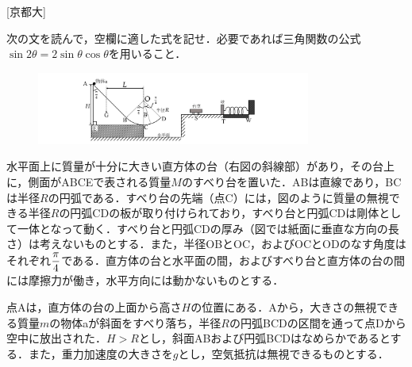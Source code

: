 

\noindent{} [京都大]

次の文を読んで，空欄に適した式を記せ．必要であれば三角関数の公式$\sin 2\theta = 2 \sin \theta \cos \theta$を用いること．

\begin{figure}
  \centering
  \includegraphics[width=9cm]{fig/fig_1_3.pdf}
\end{figure}
水平面上に質量が十分に大きい直方体の台（右図の斜線部）があり，その台上に，側面がABCEで表される質量$M$のすべり台を置いた．ABは直線であり，BCは半径$R$の円弧である．すべり台の先端（点C）には，図のように質量の無視できる半径$R$の円弧CDの板が取り付けられており，すべり台と円弧CDは剛体として一体となって動く．すべり台と円弧CDの厚み（図では紙面に垂直な方向の長さ）は考えないものとする．また，半径OBとOC，およびOCとODのなす角度はそれぞれ$\displaystyle\frac{\pi}{4}$である．直方体の台と水平面の間，およびすべり台と直方体の台の間には摩擦力が働き，水平方向には動かないものとする．

 点Aは，直方体の台の上面から高さ$H$の位置にある．Aから，大きさの無視できる質量$m$の物体aが斜面をすべり落ち，半径$R$の円弧BCDの区間を通って点Dから空中に放出された．$H > R$とし，斜面ABおよび円弧BCDはなめらかであるとする．また，重力加速度の大きさを$g$とし，空気抵抗は無視できるものとする．

